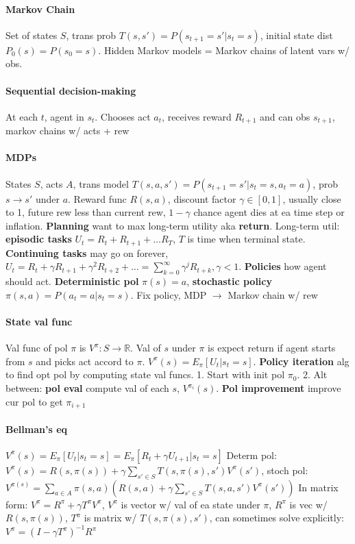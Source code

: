\paragraph{Markov Chain} Set of states $S$, trans prob
$T(s,s')=P(s_{t+1}=s'|s_t=s)$, initial state dist
$P_0(s)=P(s_0=s)$. Hidden Markov models = Markov chains of latent vars
w/ obs.
\paragraph{Sequential decision-making} At each $t$, agent in
$s_t$. Chooses act $a_t$, receives reward $R_{t+1}$ and can obs
$s_{t+1}$, markov chains w/ acts + rew
\paragraph{MDPs} States $S$, acts $A$, trans model
$T(s,a,s')=P(s_{t+1}=s'|s_t=s,a_t=a)$, prob $s \to s'$ under
$a$. Reward func $R(s,a)$, discount factor $\gamma \in [0,1]$, usually
close to 1, future rew less than current rew, $1-\gamma$ chance agent
dies at ea time step or inflation. \textbf{Planning} want to max
long-term utility aka \textbf{return}. Long-term util:
\textbf{episodic tasks} $U_t = R_t + R_{t+1} + \ldots R_T$, $T$ is
time when terminal state. \textbf{Continuing tasks} may go on forever,
$U_t = R_t + \gamma R_{t+1} + \gamma^2 R_{t+2} + \ldots =
\sum_{k=0}^{\infty}\gamma^j R_{t+k}, \gamma < 1$. \textbf{Policies} how agent
should act. \textbf{Deterministic pol} $\pi(s)=a$, \textbf{stochastic
  policy} $\pi(s,a)=P(a_t=a|s_t=s)$. Fix policy, MDP $\to$ Markov
chain w/ rew
\paragraph{State val func} Val func of pol $\pi$ is $V^\pi : S \to
\mathbb{R}$. Val of $s$ under $\pi$ is expect return if agent starts
from $s$ and picks act accord to $\pi$. $V^\pi(s)=E_\pi [U_t|s_t =
s]$. \textbf{Policy iteration} alg to find opt pol by computing state
val funcs. 1. Start with init pol $\pi_0$. 2. Alt between: \textbf{pol
eval} compute val of each $s$, $V^{\pi_i}(s)$. \textbf{Pol
improvement} improve cur pol to get $\pi_{i+1}$
\paragraph{Bellman's eq}$V^\pi (s)=E_{\pi}[U_t|s_t =
s]=E_{\pi}[R_t+\gamma U_{t+1}|s_t=s]$ Determ pol: $V^{\pi}(s)=R(s,\pi(s))+\gamma
\sum_{s' \in S}T(s,\pi(s),s')V^\pi(s')$, stoch pol: $V^{\pi(s)} =
\sum_{a \in A}\pi(s,a) (R(s,a)+\gamma \sum_{s'\in
  S}T(s,a,s')V^\pi(s'))$ In matrix form: $V^\pi = R^\pi + \gamma T^\pi
V^\pi$, $V^\pi$ is vector w/ val of ea state under $\pi$, $R^\pi$ is
vec w/ $R(s,\pi(s))$, $T^\pi$ is matrix w/ $T(s,\pi(s),s')$, can
sometimes solve explicitly: $V^\pi = (I-\gamma T^\pi)^{-1}R^{\pi}$
